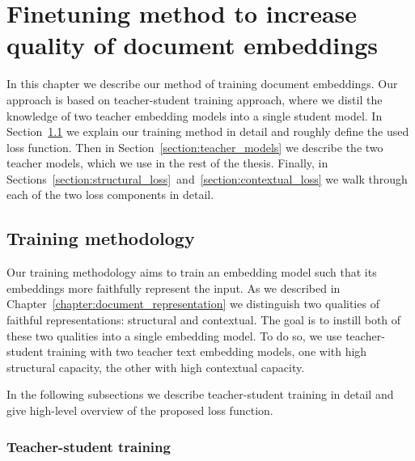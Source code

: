 \chapter{Finetuning method to increase quality of document
embeddings}\label{chapter:training_method}

In this chapter we describe our method of training document embeddings. Our
approach is based on teacher-student training approach, where we distil the
knowledge of two teacher embedding models into a single student model. In
Section~\ref{section:training_method} we explain our training method in detail
and roughly define the used loss function. Then in
Section~\ref{section:teacher_models} we describe the two teacher models, which
we use in the rest of the thesis. Finally, in
Sections~\ref{section:structural_loss}~and~\ref{section:contextual_loss} we
walk through each of the two loss components in detail.

\section{Training methodology}\label{section:training_method}


Our training methodology aims to train an embedding model such that its
embeddings more faithfully represent the input. As we described in
Chapter~\ref{chapter:document_representation} we distinguish two qualities of
faithful representations: structural and contextual. The goal is to instill
both of these two qualities into a single embedding model. To do so, we use
teacher-student training with two teacher text embedding models, one with high
structural capacity, the other with high contextual capacity.

In the following subsections we describe teacher-student training in detail and
give high-level overview of the proposed loss function.

\subsection{Teacher-student training}

